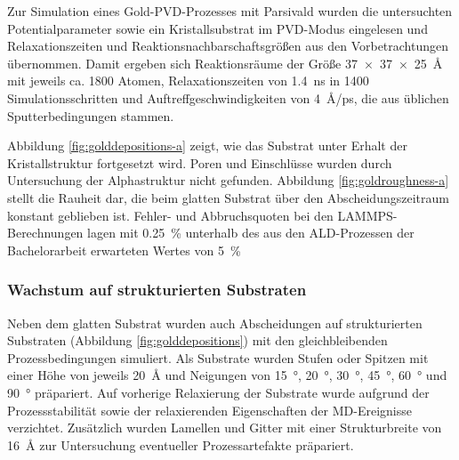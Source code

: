 Zur Simulation eines Gold-PVD-Prozesses mit Parsivald wurden die untersuchten Potentialparameter sowie ein Kristallsubstrat im PVD-Modus eingelesen und Relaxationszeiten und Reaktionsnachbarschaftsgrößen aus den Vorbetrachtungen übernommen.
Damit ergeben sich Reaktionsräume der Größe \SI{37x37x25}{\angstrom} mit jeweils ca. \num{1800} Atomen, Relaxationszeiten von \SI{1.4}{\nano\second} in \num{1400} Simulationsschritten und Auftreffgeschwindigkeiten von \SI{4}{\angstrom/\pico\second}, die aus üblichen Sputterbedingungen stammen.

Abbildung \ref{fig:golddepositions-a} zeigt, wie das Substrat unter Erhalt der Kristallstruktur fortgesetzt wird.
Poren und Einschlüsse wurden durch Untersuchung der Alphastruktur nicht gefunden.
Abbildung \ref{fig:goldroughness-a} stellt die Rauheit dar, die beim glatten Substrat über den Abscheidungszeitraum konstant geblieben ist.
Fehler- und Abbruchsquoten bei den LAMMPS-Berechnungen lagen mit \SI{0.25}{\percent} unterhalb des aus den ALD-Prozessen der Bachelorarbeit erwarteten Wertes von \SI{5}{\percent}

\subsubsection{Wachstum auf strukturierten Substraten}

Neben dem glatten Substrat wurden auch Abscheidungen auf strukturierten Substraten (Abbildung \ref{fig:golddepositions}) mit den gleichbleibenden Prozessbedingungen simuliert.
Als Substrate wurden Stufen oder Spitzen mit einer Höhe von jeweils \SI{20}{\angstrom} und Neigungen von \SI{15}{\degree}, \SI{20}{\degree}, \SI{30}{\degree}, \SI{45}{\degree}, \SI{60}{\degree} und \SI{90}{\degree} präpariert.
Auf vorherige Relaxierung der Substrate wurde aufgrund der Prozessstabilität sowie der relaxierenden Eigenschaften der MD-Ereignisse verzichtet.
Zusätzlich wurden Lamellen und Gitter mit einer Strukturbreite von \SI{16}{\angstrom} zur Untersuchung eventueller Prozessartefakte präpariert.

